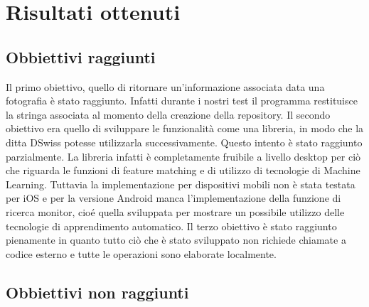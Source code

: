 \documentclass[twoside]{supsistudent}
\begin{document}
\section{Risultati ottenuti}
\subsection{Obbiettivi raggiunti}
Il primo obiettivo, quello di ritornare un'informazione associata data una fotografia è stato raggiunto. Infatti durante i nostri test il programma restituisce la stringa associata al momento della creazione della repository. 
Il secondo obiettivo era quello di sviluppare le funzionalità come una libreria, in modo che la ditta DSwiss potesse utilizzarla successivamente. Questo intento è stato raggiunto parzialmente. La libreria infatti è completamente fruibile a livello desktop per ciò che riguarda le funzioni di feature matching e di utilizzo di tecnologie di Machine Learning. Tuttavia la implementazione per dispositivi mobili non è stata testata per iOS e per la versione Android manca l'implementazione della funzione di ricerca monitor, cioé quella sviluppata per mostrare un possibile utilizzo delle tecnologie di apprendimento automatico.
Il terzo obiettivo è stato raggiunto pienamente in quanto tutto ciò che è stato sviluppato non richiede chiamate a codice esterno e tutte le operazioni sono elaborate localmente.
\subsection{Obbiettivi non raggiunti}
\end{document}
